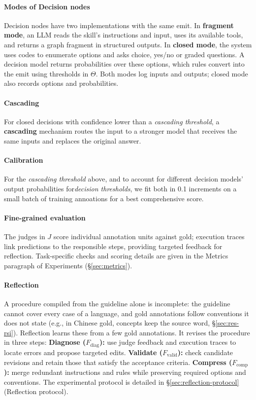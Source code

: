 \paragraph{Modes of Decision nodes}
\label{sec:modes}
Decision nodes have two implementations with the same emit.
In \textbf{fragment mode}, an LLM reads the skill's instructions and input, uses its available tools, and returns a graph fragment in structured outputs.
In \textbf{closed mode}, the system uses codes to enumerate options and asks choice, yes/no or graded questions. A decision model returns probabilities over these options, which rules convert into the emit using thresholds in $\Theta$. 
Both modes log inputs and outputs; closed mode also records options and probabilities.

\paragraph{Cascading}
For closed decisions with confidence lower than a \textit{cascading threshold}, a \textbf{cascading} mechanism routes the input to a stronger model that receives the same inputs and replaces the original answer.

\paragraph{Calibration}
\label{sec:calibration}
For the \textit{cascading threshold} above, and to account for different decision models' output probabilities for\textit{decision thresholds}, we fit both in 0.1 increments on a small batch of training annoations for a best comprehensive score.

\paragraph{Fine-grained evaluation}
\label{sec:evaluation}
The judges in $J$ score individual annotation units against gold; execution traces link predictions to the responsible steps, providing targeted feedback for reflection. Task-specific checks and scoring details are given in the Metrics paragraph of Experiments (\S\ref{sec:metrics}).

\paragraph{Reflection}
\label{sec:reflect}
A procedure compiled from the guideline alone is incomplete: the guideline cannot cover every case of a language, and gold annotations follow conventions it does not state (e.g., in Chinese \umr gold, concepts keep the source word, \S\ref{sec:res-rsi}). Reflection learns these from a few gold annotations. It revises the procedure in three steps:
\textbf{Diagnose ($F_{\mathrm{diag}}$):} use judge feedback and execution traces to locate errors and propose targeted edits.
\textbf{Validate ($F_{\mathrm{valid}}$):} check candidate revisions and retain those that satisfy the acceptance criteria.
\textbf{Compress ($F_{\mathrm{comp}}$):} merge redundant instructions and rules while preserving required options and conventions.
The experimental protocol is detailed in \S\ref{sec:reflection-protocol} (Reflection protocol).

